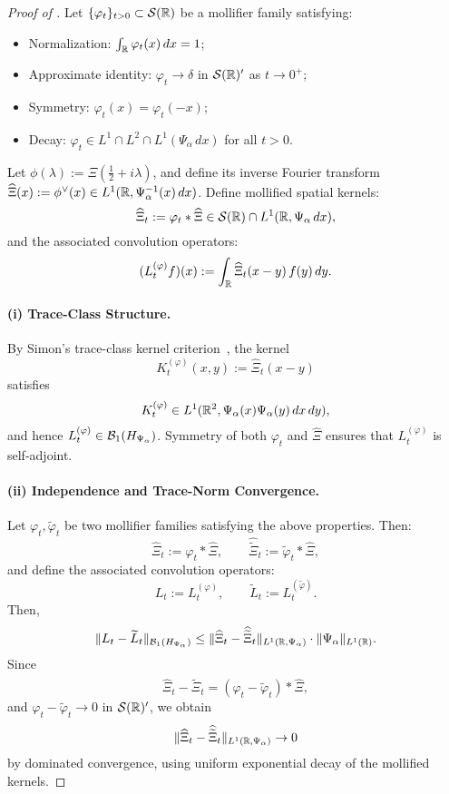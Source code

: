 \begin{proof}[Proof of ]
Let \( \{\varphi_t\}_{t > 0} \subset \mathcal{S}(\mathbb{R}) \) be a mollifier family satisfying:
\begin{itemize}
  \item Normalization: \( \int_{\mathbb{R}} \varphi_t(x)\, dx = 1 \);
  \item Approximate identity: \( \varphi_t \to \delta \) in \( \mathcal{S}(\mathbb{R})' \) as \( t \to 0^+ \);
  \item Symmetry: \( \varphi_t(x) = \varphi_t(-x) \);
  \item Decay: \( \varphi_t \in L^1 \cap L^2 \cap L^1(\Psi_\alpha\, dx) \) for all \( t > 0 \).
\end{itemize}

Let \( \phi(\lambda) := \Xi\left( \tfrac{1}{2} + i\lambda \right) \), and define its inverse Fourier transform \( \widehat{\Xi}(x) := \phi^\vee(x) \in L^1(\mathbb{R}, \Psi_\alpha^{-1}(x)\, dx) \). Define mollified spatial kernels:
\[
\widehat{\Xi}_t := \varphi_t * \widehat{\Xi} \in \mathcal{S}(\mathbb{R}) \cap L^1(\mathbb{R}, \Psi_\alpha\, dx),
\]
and the associated convolution operators:
\[
(L_t^{(\varphi)} f)(x) := \int_{\mathbb{R}} \widehat{\Xi}_t(x - y)\, f(y)\, dy.
\]

\paragraph{(i) Trace-Class Structure.}  
By Simon’s trace-class kernel criterion~\cite[Thm.~4.2]{Simon2005TraceIdeals}, the kernel
\[
K_t^{(\varphi)}(x, y) := \widehat{\Xi}_t(x - y)
\]
satisfies
\[
K_t^{(\varphi)} \in L^1(\mathbb{R}^2, \Psi_\alpha(x) \Psi_\alpha(y)\, dx\, dy),
\]
and hence \( L_t^{(\varphi)} \in \mathcal{B}_1(H_{\Psi_\alpha}) \). Symmetry of both \( \varphi_t \) and \( \widehat{\Xi} \) ensures that \( L_t^{(\varphi)} \) is self-adjoint.

\paragraph{(ii) Independence and Trace-Norm Convergence.}  
Let \( \varphi_t, \tilde{\varphi}_t \) be two mollifier families satisfying the above properties. Then:
\[
\widehat{\Xi}_t := \varphi_t * \widehat{\Xi}, \qquad \widehat{\widetilde{\Xi}}_t := \tilde{\varphi}_t * \widehat{\Xi},
\]
and define the associated convolution operators:
\[
L_t := L_t^{(\varphi)}, \qquad \widetilde{L}_t := L_t^{(\tilde{\varphi})}.
\]
Then,
\[
\| L_t - \widetilde{L}_t \|_{\mathcal{B}_1(H_{\Psi_\alpha})}
\le \| \widehat{\Xi}_t - \widehat{\widetilde{\Xi}}_t \|_{L^1(\mathbb{R}, \Psi_\alpha)} \cdot \| \Psi_\alpha \|_{L^1(\mathbb{R})}.
\]
Since
\[
\widehat{\Xi}_t - \widehat{\widetilde{\Xi}}_t = (\varphi_t - \tilde{\varphi}_t) * \widehat{\Xi},
\]
and \( \varphi_t - \tilde{\varphi}_t \to 0 \) in \( \mathcal{S}(\mathbb{R})' \), we obtain
\[
\| \widehat{\Xi}_t - \widehat{\widetilde{\Xi}}_t \|_{L^1(\mathbb{R}, \Psi_\alpha)} \to 0
\]
by dominated convergence, using uniform exponential decay of the mollified kernels.


\end{proof}
